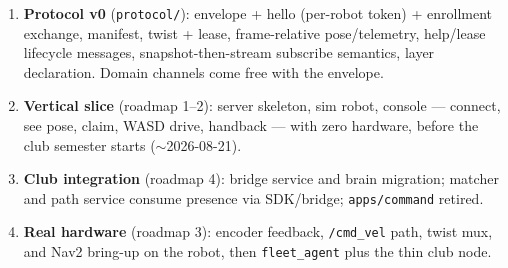 \documentclass[11pt]{article}
\begin{document}
\begin{enumerate}[itemsep=1pt]
  \item \textbf{Protocol v0} (\texttt{protocol/}): envelope + hello (per-robot
        token) + enrollment exchange, manifest, twist + lease, frame-relative
        pose/telemetry, help/lease lifecycle messages, snapshot-then-stream subscribe
        semantics, layer declaration. Domain channels come free with the envelope.
  \item \textbf{Vertical slice} (roadmap 1--2): server skeleton, sim robot, console
        --- connect, see pose, claim, WASD drive, handback --- with zero hardware,
        before the club semester starts ($\sim$2026-08-21).
  \item \textbf{Club integration} (roadmap 4): bridge service and brain migration;
        matcher and path service consume presence via SDK/bridge;
        \texttt{apps/command} retired.
  \item \textbf{Real hardware} (roadmap 3): encoder feedback, \texttt{/cmd\_vel}
        path, twist mux, and Nav2 bring-up on the robot, then \texttt{fleet\_agent}
        plus the thin club node.
\end{enumerate}
\end{document}
